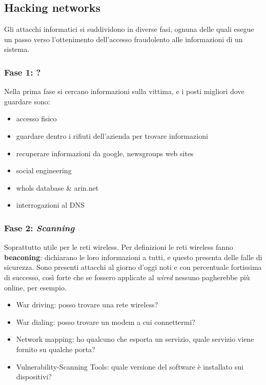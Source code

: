 
\subsection{Hacking networks}

Gli attacchi informatici si suddividono in diverse fasi, ognuna delle quali 
esegue un passo verso l'ottenimento dell'accesso fraudolento alle informazioni 
di un sistema.

\subsubsection{Fase 1: ?}

Nella prima fase si cercano informazioni sulla vittima, e i posti migliori dove 
guardare sono:
\begin{itemize}
 \item accesso fisico
 \item guardare dentro i rifiuti dell'azienda per trovare informazioni
 \item recuperare informazioni da google, newsgroups web sites
 \item social engineering
 \item whols database \& arin.net
 \item interrogazioni al DNS
\end{itemize}

\subsubsection{Fase 2: \textit{Scanning}}

Soprattutto utile per le reti wireless. Per definizioni le reti wireless fanno 
\textbf{beaconing}: dichiarano le loro informazioni a tutti, e questo presenta 
delle falle di sicurezza. Sono presenti attacchi al giorno d'oggi noti e con 
percentuale fortissima di successo, così forte che se fossero applicate al 
\textit{wired} nessuno pagherebbe più online, per esempio.

\begin{itemize}
\item War driving: posso trovare una rete wireless?
\item War dialing: posso trovare un modem a cui connettermi?
\item Network mapping: ho qualcuno che esporta un servizio, quale servizio 
viene fornito su qualche porta?
\item Vulnerability-Scanning Tools: quale versione del software è installato 
sui dispositivi?
\end{itemize}

